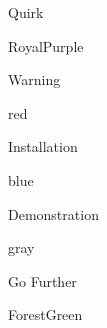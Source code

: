\usepackage{tcolorbox}

\newcommand{\defprop}[3]{
  \expandafter\def\csname @val@#1@#2\endcsname{#3}
}

\newcommand{\getprop}[2]{%
  \ifcsname @val@#1@#2\endcsname%
  \csname @val@#1@#2\endcsname%
  \fi
}

\newcommand{\defbox}[3]{
  \defprop{#1}{title}{#2}
  \defprop{#1}{color}{#3}
}

\defbox{quirk}{Quirk}{RoyalPurple}
\defbox{warning}{Warning}{red}
\defbox{installation}{Installation}{blue}
\defbox{demo}{Demonstration}{gray}
\defbox{further}{Go Further}{ForestGreen}

\newenvironment{bookblock}[1]{
  \ifcsname @val@#1@color\endcsname
  \begin{tcolorbox}[colback=\getprop{#1}{color}!5!white,
                    colframe=\getprop{#1}{color}!75!white,
                    title={\getprop{#1}{title}}]
  \else
  \PackageError{bookblock}{Unknown book block '#1'}{}
  \fi
}{
\end{tcolorbox}
}

